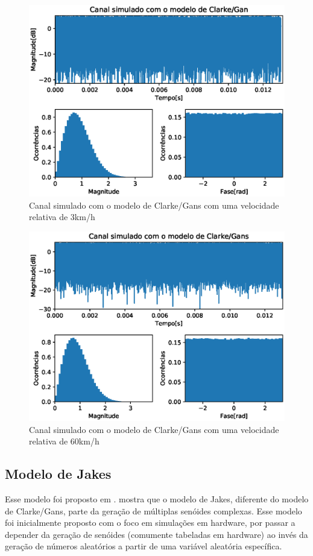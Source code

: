 \documentclass[journal,11pt,twocolumn]{IEEEtran}
\begin{document}
\begin{figure}[h!]
    \centering
    \includegraphics[scale=0.55]{gans_3kmh.eps}
    \caption{Canal simulado com o modelo de Clarke/Gans com uma velocidade relativa de 3km/h}
    \label{fig:gans-3km-h}
\end{figure}
\begin{figure}[h!]
    \centering
    \includegraphics[scale=0.55]{gans_60kmh.eps}
    \caption{Canal simulado com o modelo de Clarke/Gans com uma velocidade relativa de 60km/h}
    \label{fig:gans-60km-h}
\end{figure}
\subsection{Modelo de Jakes}
Esse modelo foi proposto em \cite{jakes}. \cite{mimo} mostra que o modelo de Jakes, diferente do modelo de Clarke/Gans, parte da geração de múltiplas senóides complexas. Esse modelo foi inicialmente proposto com o foco em simulações em hardware, por passar a depender da geração de senóides (comumente tabeladas em hardware) ao invés da geração de números aleatórios a partir de uma variável aleatória específica.
\end{document}
